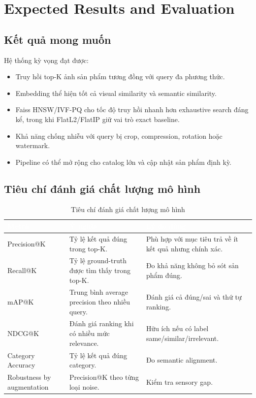 \documentclass[12pt,a4paper]{article}
\begin{document}
\section{Expected Results and Evaluation}

\subsection{Kết quả mong muốn}
Hệ thống kỳ vọng đạt được:
\begin{itemize}
  \item Truy hồi top-K ảnh sản phẩm tương đồng với query đa phương thức.
  \item Embedding thể hiện tốt cả visual similarity và semantic similarity.
  \item Faiss HNSW/IVF-PQ cho tốc độ truy hồi nhanh hơn exhaustive search đáng kể, trong khi FlatL2/FlatIP giữ vai trò exact baseline.
  \item Khả năng chống nhiễu với query bị crop, compression, rotation hoặc watermark.
  \item Pipeline có thể mở rộng cho catalog lớn và cập nhật sản phẩm định kỳ.
\end{itemize}

\subsection{Tiêu chí đánh giá chất lượng mô hình}
\begin{table}[htbp]
\centering
\begin{tabularx}{\linewidth}{@{}L{2.8cm}YY@{}}
\toprule
{}
\textcolor{white}{\textbf{Metric}} & \textcolor{white}{\textbf{Ý nghĩa}} & \textcolor{white}{\textbf{Lý do dùng}} \\
\midrule
Precision@K & Tỷ lệ kết quả đúng trong top-K. & Phù hợp với mục tiêu trả về ít kết quả nhưng chính xác. \\
Recall@K & Tỷ lệ ground-truth được tìm thấy trong top-K. & Đo khả năng không bỏ sót sản phẩm đúng. \\
mAP@K & Trung bình average precision theo nhiều query. & Đánh giá cả đúng/sai và thứ tự ranking. \\
NDCG@K & Đánh giá ranking khi có nhiều mức relevance. & Hữu ích nếu có label same/similar/irrelevant. \\
Category Accuracy & Tỷ lệ kết quả đúng category. & Đo semantic alignment. \\
Robustness by augmentation & Precision@K theo từng loại noise. & Kiểm tra sensory gap. \\
\bottomrule
\end{tabularx}
\caption{Tiêu chí đánh giá chất lượng mô hình}
\end{table}
\end{document}
